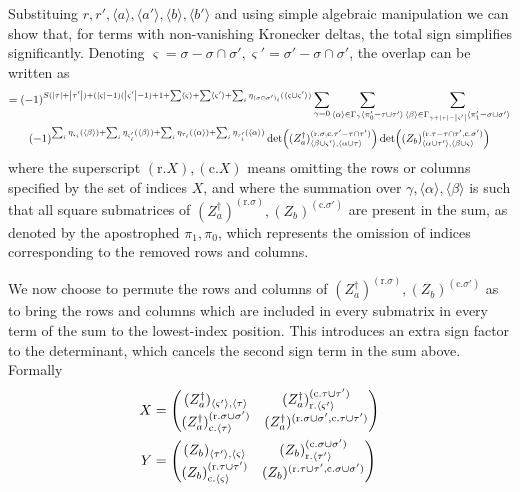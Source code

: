 \documentclass[12pt]{article}
\newcommand{\seq}[1]{\langle #1\rangle}
\newcommand{\hc}{^\dagger}
\begin{document}
	Substituing $r, r', \seq{a},\seq{a'}, \seq{b},\seq{b'}$ and using simple algebraic manipulation we can show that, for terms with non-vanishing Kronecker deltas, the total sign simplifies significantly. Denoting $\varsigma=\sigma-\sigma\cap\sigma',\varsigma'=\sigma'-\sigma\cap\sigma'$, the overlap can be written as
	\begin{multline}
	=(-1)^{S(\abs{\tau}+\abs{\tau'})+(\abs{\varsigma}-1)(\abs{\varsigma'}-1)+1+\sum\seq{\varsigma}+\sum\seq{\varsigma'}+\sum_i\eta_{(\sigma\cap\sigma')_i}(\seq{\varsigma\cup\varsigma'})}\sum_{\gamma=0}\sum_{\seq{\alpha}\in\Gamma_{\gamma}\seq{\pi'_0-\tau\cup\tau'}}\sum_{\seq{\beta}\in\Gamma_{\gamma+\abs{\tau}-\abs{\varsigma'}}\seq{\pi'_1-\sigma\cup\sigma'}}\\
	(-1)^{\sum_i\eta_{\varsigma_i}(\seq{\beta})+\sum_i\eta_{\varsigma'_i}(\seq{\beta})+\sum_i\eta_{\tau_i}(\seq{\alpha})+\sum_i\eta_{\tau'_i}(\seq{\alpha})}\det((Z_a\hc)^{(\text{r.} \sigma, \text{c.} \tau'-\tau\cap\tau')}_{\seq{\beta\cup\varsigma'}, \seq{\alpha\cup\tau}})\det((Z_b)^{(\text{r.} \tau-\tau\cap\tau', \text{c.} \sigma')}_{\seq{\alpha\cup\tau'},\seq{\beta\cup\varsigma}})
	\end{multline}
	where the superscript $(\text{r.} X), (\text{c.} X)$ means omitting the rows or columns specified by the set of indices $X$, and where the summation over $\gamma,\seq{\alpha},\seq{\beta}$ is such that all square submatrices of $(Z_a\hc)^{(\text{r.} \sigma)},(Z_b)^{(\text{c.} \sigma')}$ are present in the sum, as denoted by the apostrophed $\pi_1,\pi_0$, which represents the omission of indices corresponding to the removed rows and columns.
	
	We now choose to permute the rows and columns of $(Z_a\hc)^{(\text{r.} \sigma)},(Z_b)^{(\text{c.} \sigma')}$ as to bring the rows and columns which are included in every submatrix in every term of the sum to the lowest-index position. This introduces an extra sign factor to the determinant, which cancels the second sign term in the sum above. Formally
	\begin{align}
	X &= \mqty(
		(Z_a\hc)_{\seq{\varsigma'},\seq{\tau}} & (Z_a\hc)^{(\text{c.} \tau\cup\tau')}_{\text{r.} \seq{\varsigma'}}\\
		(Z_a\hc)^{(\text{r.} \sigma\cup\sigma')}_{\text{c.} \seq{\tau}} & (Z_a\hc)^{(\text{r.} \sigma\cup\sigma', \text{c.} \tau\cup\tau')}
	)\\
	Y &= \mqty(
		(Z_b)_{\seq{\tau'},\seq{\varsigma}} & (Z_b)^{(\text{c.} \sigma\cup\sigma')}_{\text{r.} \seq{\tau'}}\\
		(Z_b)^{(\text{r.} \tau\cup\tau')}_{\text{c.} \seq{\varsigma}} & (Z_b)^{(\text{r.} \tau\cup\tau', \text{c.} \sigma\cup\sigma')}
	)
	\end{align}
	
\end{document}
